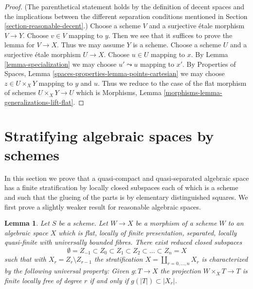 \documentclass{stacks-project}
\theoremstyle{plain}
\newtheorem{lemma}[subsection]{Lemma}
\theoremstyle{definition}
\theoremstyle{remark}
\numberwithin{equation}{subsection}
\begin{document}
\begin{proof}
(The parenthetical statement holds by the definition of decent spaces
and the implications between the different separation conditions
mentioned in Section \ref{section-reasonable-decent}.)
Choose a scheme $V$ and a surjective \'etale morphism $V \to Y$.
Choose $v \in V$ mapping to $y$. Then we see that it suffices to
prove the lemma for $V \to X$. Thus we may assume $Y$ is a scheme.
Choose a scheme $U$ and a surjective \'etale morphism $U \to X$.
Choose $u \in U$ mapping to $x$. By Lemma \ref{lemma-specialization}
we may choose $u' \leadsto u$ mapping to $x'$. By
Properties of Spaces, Lemma \ref{spaces-properties-lemma-points-cartesian}
we may choose $z \in U \times_X Y$ mapping to $y$ and $u$.
Thus we reduce to the case of the flat morphism of
schemes $U \times_X Y \to U$ which is
Morphisms, Lemma \ref{morphisms-lemma-generalizations-lift-flat}.
\end{proof}






\section{Stratifying algebraic spaces by schemes}
\label{section-stratifications}

\noindent
In this section we prove that a quasi-compact and quasi-separated
algebraic space has a finite stratification by locally closed subspaces
each of which is a scheme and such that the glueing of the parts is by
elementary distinguished squares. We first prove a slightly weaker
result for reasonable algebraic spaces.

\begin{lemma}
\label{lemma-quasi-compact-reasonable-stratification}
Let $S$ be a scheme. Let $W \to X$ be a morphism of a scheme $W$
to an algebraic space $X$ which is flat, locally of finite presentation,
separated, locally quasi-finite with universally bounded fibres. There exist
reduced closed subspaces
$$
\emptyset = Z_{-1} \subset Z_0 \subset Z_1 \subset Z_2 \subset
\ldots \subset Z_n = X
$$
such that with $X_r = Z_r \setminus Z_{r - 1}$ the stratification
$X = \coprod_{r = 0, \ldots, n} X_r$ is characterized by the following
universal property: Given $g : T \to X$ the projection
$W \times_X T \to T$ is finite locally free of degree $r$ if and only if
$g(|T|) \subset |X_r|$.
\end{lemma}
\end{document}
